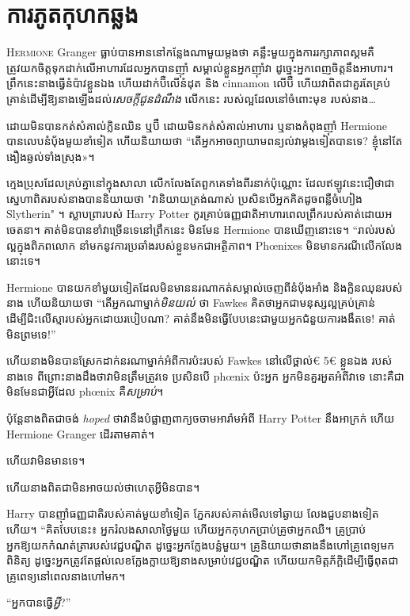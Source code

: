 \chapter{ការភូតកុហកឆ្លង}

\lettrine{H}{ermione} Granger ធ្លាប់បានអាននៅកន្លែងណាមួយម្តងថា គន្លឹះមួយក្នុងការរក្សាភាពស្គមគឺត្រូវយកចិត្តទុកដាក់លើអាហារដែលអ្នកបានញ៉ាំ សម្គាល់ខ្លួនអ្នកញ៉ាំវា ដូច្នេះអ្នកពេញចិត្តនឹងអាហារ។ ព្រឹកនេះនាងធ្វើនំប៉ាវខ្លួនឯង ហើយដាក់ប៊ឺលើនំដុត និង cinnamon លើប៊ឺ ហើយវាពិតជាគួរតែគ្រប់គ្រាន់ដើម្បីឱ្យនាងឡើងដល់\emph{សេចក្តីជូនដំណឹង} លើកនេះ របស់ល្អដែលនៅចំពោះមុខ របស់នាង…

ដោយមិនបានកត់សំគាល់ក្លិនឈិន ឬប៊ឺ ដោយមិនកត់សំគាល់អាហារ ឬនាងកំពុងញ៉ាំ Hermione បានលេបនំប៉័ងមួយខាំទៀត ហើយនិយាយថា “តើអ្នកអាចព្យាយាមពន្យល់វាម្តងទៀតបានទេ? ខ្ញុំ​នៅ​តែ​ងឿង​ឆ្ងល់​ទាំង​ស្រុង»។

ក្មេងប្រុសដែលគ្រប់គ្នានៅក្នុងសាលា លើកលែងតែពួកគេទាំងពីរនាក់ប៉ុណ្ណោះ ដែលឥឡូវនេះជឿថាជាស្នេហាពិតរបស់នាងបាននិយាយថា "វានិយាយត្រង់ណាស់ ប្រសិនបើអ្នកគិតដូចពន្លឺចំហៀង Slytherin" ។ ស្លាបព្រារបស់ Harry Potter កូរគ្រាប់ធញ្ញជាតិអាហារពេលព្រឹករបស់គាត់ដោយអចេតនា។ គាត់មិនបានខាំវាច្រើនទេនៅព្រឹកនេះ មិនមែន Hermione បានឃើញនោះទេ។ “រាល់របស់ល្អក្នុងពិភពលោក នាំមកនូវការប្រឆាំងរបស់ខ្លួនមកជាអត្ថិភាព។ Phœnixes មិនមានករណីលើកលែងនោះទេ។

Hermione បានយកខាំមួយទៀតដែលមិនមាននរណាកត់សម្គាល់ចេញពីនំបុ័ងអាំង និងក្លិនឈុនរបស់នាង ហើយនិយាយថា “តើអ្នកណាម្នាក់\emph{មិនយល់} ថា Fawkes គិតថាអ្នកជាមនុស្សល្អគ្រប់គ្រាន់ដើម្បីជិះលើស្មារបស់អ្នកដោយរបៀបណា? គាត់នឹងមិនធ្វើបែបនេះជាមួយអ្នកជំនួយការងងឹតទេ! គាត់មិនព្រមទេ!”

ហើយនាងមិនបានស្រែកដាក់នរណាម្នាក់អំពីការប៉ះរបស់ Fawkes នៅលើថ្ពាល់€ 5€{ ខ្លួនឯង} របស់នាងទេ ពីព្រោះនាងដឹងថាវាមិនត្រឹមត្រូវទេ ប្រសិនបើ phœnix ប៉ះអ្នក អ្នកមិនគួរអួតអំពីវាទេ នោះគឺជា មិនមែនជាអ្វីដែល phœnix គឺ\emph{សម្រាប់}។

ប៉ុន្តែនាងពិតជាចង់ \emph{hoped} ថាវានឹងបំផ្លាញពាក្យចចាមអារ៉ាមអំពី Harry Potter នឹងអាក្រក់ ហើយ Hermione Granger ដើរតាមគាត់។

ហើយវាមិនមានទេ។

ហើយ​នាង​ពិត​ជា​មិន​អាច​យល់​ថា​ហេតុ​អ្វី​មិន​បាន។

Harry បានញ៉ាំធញ្ញជាតិរបស់គាត់មួយខាំទៀត ភ្នែករបស់គាត់មើលទៅឆ្ងាយ លែងជួបនាងទៀតហើយ។ “គិត​បែប​នេះ៖ អ្នក​រំលង​សាលា​ថ្ងៃ​មួយ ហើយ​អ្នក​កុហក​ប្រាប់​គ្រូ​ថា​អ្នក​ឈឺ។ គ្រូប្រាប់អ្នកឱ្យយកកំណត់ត្រារបស់វេជ្ជបណ្ឌិត ដូច្នេះអ្នកក្លែងបន្លំមួយ។ គ្រូនិយាយថានាងនឹងហៅគ្រូពេទ្យមកពិនិត្យ ដូច្នេះអ្នកត្រូវតែផ្តល់លេខក្លែងក្លាយឱ្យនាងសម្រាប់វេជ្ជបណ្ឌិត ហើយយកមិត្តភ័ក្តិដើម្បីធ្វើពុតជាគ្រូពេទ្យនៅពេលនាងហៅមក។

“អ្នកបានធ្វើ\emph{អ្វី}?”

